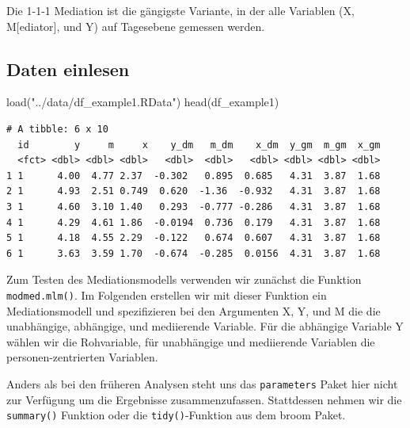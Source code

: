 \documentclass[
  letterpaper,
  DIV=11,
  numbers=noendperiod]{scrreprt}
\newenvironment{Shaded}{\begin{snugshade}}{\end{snugshade}}
\newcommand{\FunctionTok}[1]{\textcolor[rgb]{0.28,0.35,0.67}{#1}}
\newcommand{\NormalTok}[1]{\textcolor[rgb]{0.00,0.23,0.31}{#1}}
\newcommand{\StringTok}[1]{\textcolor[rgb]{0.13,0.47,0.30}{#1}}
\begin{document}
Die 1-1-1 Mediation ist die gängigste Variante, in der alle Variablen
(X, M{[}ediator{]}, und Y) auf Tagesebene gemessen werden.

\subsection{Daten einlesen}\label{daten-einlesen-2}

\begin{Shaded}
\begin{Highlighting}[]
\FunctionTok{load}\NormalTok{(}\StringTok{"../data/df\_example1.RData"}\NormalTok{)}
\FunctionTok{head}\NormalTok{(df\_example1)}
\end{Highlighting}
\end{Shaded}

\begin{verbatim}
# A tibble: 6 x 10
  id        y     m     x    y_dm   m_dm    x_dm  y_gm  m_gm  x_gm
  <fct> <dbl> <dbl> <dbl>   <dbl>  <dbl>   <dbl> <dbl> <dbl> <dbl>
1 1      4.00  4.77 2.37  -0.302   0.895  0.685   4.31  3.87  1.68
2 1      4.93  2.51 0.749  0.620  -1.36  -0.932   4.31  3.87  1.68
3 1      4.60  3.10 1.40   0.293  -0.777 -0.286   4.31  3.87  1.68
4 1      4.29  4.61 1.86  -0.0194  0.736  0.179   4.31  3.87  1.68
5 1      4.18  4.55 2.29  -0.122   0.674  0.607   4.31  3.87  1.68
6 1      3.63  3.59 1.70  -0.674  -0.285  0.0156  4.31  3.87  1.68
\end{verbatim}

Zum Testen des Mediationsmodells verwenden wir zunächst die Funktion
\texttt{modmed.mlm()}. Im Folgenden erstellen wir mit dieser Funktion
ein Mediationsmodell und spezifizieren bei den Argumenten X, Y, und M
die die unabhängige, abhängige, und mediierende Variable. Für die
abhängige Variable Y wählen wir die Rohvariable, für unabhängige und
mediierende Variablen die personen-zentrierten Variablen.

Anders als bei den früheren Analysen steht uns das \texttt{parameters}
Paket hier nicht zur Verfügung um die Ergebnisse zusammenzufassen.
Stattdessen nehmen wir die \texttt{summary()} Funktion oder die
\texttt{tidy()}-Funktion aus dem broom Paket.
\end{document}
